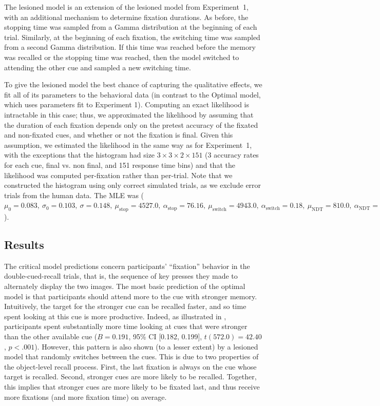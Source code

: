 The lesioned model is an extension of the lesioned model from Experiment~1, with an additional mechanism to determine fixation durations. As before, the stopping time was sampled from a Gamma distribution at the beginning of each trial. Similarly, at the beginning of each fixation, the switching time was sampled from a second Gamma distribution. If this time was reached before the memory was recalled or the stopping time was reached, then the model switched to attending the other cue and sampled a new switching time.

To give the lesioned model the best chance of capturing the qualitative effects, we fit all of its parameters to the behavioral data (in contrast to the Optimal model, which uses parameters fit to Experiment 1). Computing an exact likelihood is intractable in this case; thus, we approximated the likelihood by assuming that the duration of each fixation depends only on the pretest accuracy of the fixated and non-fixated cues, and whether or not the fixation is final. Given this assumption, we estimated the likelihood in the same way as for Experiment~1, with the exceptions that the histogram had size $3 \times 3 \times 2 \times 151$ (3 accuracy rates for each cue, final vs. non final, and 151 response time bins) and that the likelihood was computed per-fixation rather than per-trial. Note that we constructed the histogram using only correct simulated trials, as we exclude error trials from the human data. The MLE was (\(
            \mu_0 = 0.083,\ 
            \sigma_0 = 0.103,\ 
            \sigma = 0.148,\ 
            \mu_\text{stop} = 4527.0,\ 
            \alpha_\text{stop} = 76.16,\ 
            \mu_\text{switch} = 4943.0,\ 
            \alpha_\text{switch} = 0.18,\ 
            \mu_\text{NDT} = 810.0,\ 
            \alpha_\text{NDT} = 3.59,\ 
        \)).

\subsection{Results}

The critical model predictions concern participants' ``fixation'' behavior in the double-cued-recall trials, that is, the sequence of key presses they made to alternately display the two images. The most basic prediction of the optimal model is that participants should attend more to the cue with stronger memory. Intuitively, the target for the stronger cue can be recalled faster, and so time spent looking at this cue is more productive. Indeed, as illustrated in , participants spent substantially more time looking at cues that were stronger than the other available cue ($B = 0.191$, 95\% CI [0.182, 0.199], $t(572.0)=42.40$, $p < .001$). However, this pattern is also shown (to a lesser extent) by a lesioned model that randomly switches between the cues. This is due to two properties of the object-level recall process. First, the last fixation is always on the cue whose target is recalled. Second, stronger cues are more likely to be recalled. Together, this implies that stronger cues are more likely to be fixated last, and thus receive more fixations (and more fixation time) on average.

